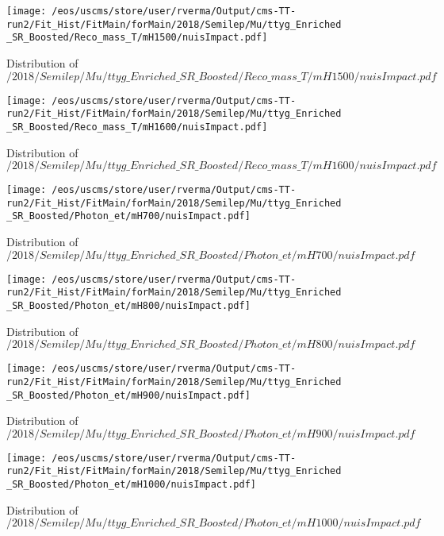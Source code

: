 \begin{figure}
\centering
\texttt{[image: /eos/uscms/store/user/rverma/Output/cms-TT-run2/Fit\_Hist/FitMain/forMain/2018/Semilep/Mu/ttyg\_Enriched\_SR\_Boosted/Reco\_mass\_T/mH1500/nuisImpact.pdf]}
\caption{Distribution of $/2018/Semilep/Mu/ttyg\_Enriched\_SR\_Boosted/Reco\_mass\_T/mH1500/nuisImpact.pdf$}
\end{figure}

\begin{figure}
\centering
\texttt{[image: /eos/uscms/store/user/rverma/Output/cms-TT-run2/Fit\_Hist/FitMain/forMain/2018/Semilep/Mu/ttyg\_Enriched\_SR\_Boosted/Reco\_mass\_T/mH1600/nuisImpact.pdf]}
\caption{Distribution of $/2018/Semilep/Mu/ttyg\_Enriched\_SR\_Boosted/Reco\_mass\_T/mH1600/nuisImpact.pdf$}
\end{figure}

\begin{figure}
\centering
\texttt{[image: /eos/uscms/store/user/rverma/Output/cms-TT-run2/Fit\_Hist/FitMain/forMain/2018/Semilep/Mu/ttyg\_Enriched\_SR\_Boosted/Photon\_et/mH700/nuisImpact.pdf]}
\caption{Distribution of $/2018/Semilep/Mu/ttyg\_Enriched\_SR\_Boosted/Photon\_et/mH700/nuisImpact.pdf$}
\end{figure}

\begin{figure}
\centering
\texttt{[image: /eos/uscms/store/user/rverma/Output/cms-TT-run2/Fit\_Hist/FitMain/forMain/2018/Semilep/Mu/ttyg\_Enriched\_SR\_Boosted/Photon\_et/mH800/nuisImpact.pdf]}
\caption{Distribution of $/2018/Semilep/Mu/ttyg\_Enriched\_SR\_Boosted/Photon\_et/mH800/nuisImpact.pdf$}
\end{figure}

\begin{figure}
\centering
\texttt{[image: /eos/uscms/store/user/rverma/Output/cms-TT-run2/Fit\_Hist/FitMain/forMain/2018/Semilep/Mu/ttyg\_Enriched\_SR\_Boosted/Photon\_et/mH900/nuisImpact.pdf]}
\caption{Distribution of $/2018/Semilep/Mu/ttyg\_Enriched\_SR\_Boosted/Photon\_et/mH900/nuisImpact.pdf$}
\end{figure}

\begin{figure}
\centering
\texttt{[image: /eos/uscms/store/user/rverma/Output/cms-TT-run2/Fit\_Hist/FitMain/forMain/2018/Semilep/Mu/ttyg\_Enriched\_SR\_Boosted/Photon\_et/mH1000/nuisImpact.pdf]}
\caption{Distribution of $/2018/Semilep/Mu/ttyg\_Enriched\_SR\_Boosted/Photon\_et/mH1000/nuisImpact.pdf$}
\end{figure}

